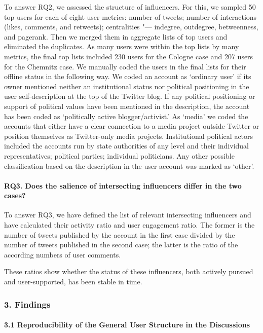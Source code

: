 To answer RQ2, we assessed the structure of influencers. For this, we sampled 50 top users for each of eight user metrics: number of tweets; number of interactions (likes, comments, and retweets); centralities "--- indegree, outdegree, betweenness, and pagerank. Then we merged them in aggregate lists of top users and eliminated the duplicates. As many users were within the top lists by many metrics, the final top lists included 230 users for the Cologne case and 207 users for the Chemnitz case. We manually coded the users in the final lists for their offline status in the following way. We coded an account as ‘ordinary user’ if its owner mentioned neither an institutional status nor political positioning in the user self-description at the top of the Twitter blog. If any political positioning or support of political values have been mentioned in the description, the account has been coded as ‘politically active blogger/activist.’ As ‘media’ we coded the accounts that either have a clear connection to a media project outside Twitter or position themselves as Twitter-only media projects. Institutional political actors included the accounts run by state authorities of any level and their individual representatives; political parties; individual politicians. Any other possible classification based on the description in the user account was marked as ‘other’.

\paragraph{RQ3. Does the salience of intersecting influencers differ in the two cases?}

To answer RQ3, we have defined the list of relevant intersecting influencers and have calculated their activity ratio and user engagement ratio. The former is the number of tweets published by the account in the first case divided by the number of tweets published in the second case; the latter is the ratio of the according numbers of user comments.

These ratios show whether the status of these influencers, both actively pursued and user-supported, has been stable in time.

\subsubsection{3. Findings}

\paragraph{3.1 Reproducibility of the General User Structure in the Discussions}


